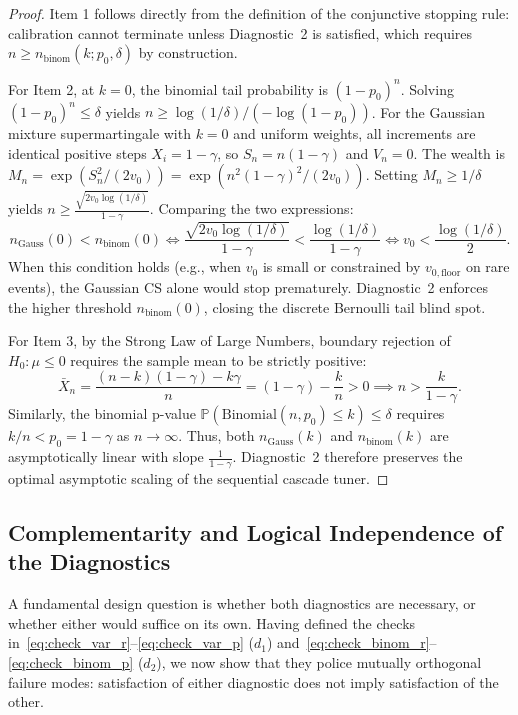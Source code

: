 \documentclass[11pt,a4paper]{article}
\begin{document}
\begin{proof}
Item 1 follows directly from the definition of the conjunctive stopping rule: calibration cannot terminate unless Diagnostic~2 is satisfied, which requires $n \ge n_{\text{binom}}(k; p_0, \delta)$ by construction.

For Item 2, at $k=0$, the binomial tail probability is $(1 - p_0)^n$. Solving $(1 - p_0)^n \le \delta$ yields $n \ge \log(1/\delta) / (-\log(1 - p_0))$.
For the Gaussian mixture supermartingale with $k=0$ and uniform weights, all increments are identical positive steps $X_i = 1 - \gamma$, so $S_n = n(1 - \gamma)$ and $V_n = 0$.
The wealth is $M_n = \exp(S_n^2 / (2 v_0)) = \exp(n^2 (1 - \gamma)^2 / (2 v_0))$.
Setting $M_n \ge 1/\delta$ yields $n \ge \frac{\sqrt{2 v_0 \log(1/\delta)}}{1 - \gamma}$.
Comparing the two expressions:
\begin{equation}
n_{\text{Gauss}}(0) < n_{\text{binom}}(0) \iff \frac{\sqrt{2 v_0 \log(1/\delta)}}{1 - \gamma} < \frac{\log(1/\delta)}{1 - \gamma} \iff v_0 < \frac{\log(1/\delta)}{2}.
\end{equation}
When this condition holds (e.g., when $v_0$ is small or constrained by $v_{0, \text{floor}}$ on rare events), the Gaussian CS alone would stop prematurely. Diagnostic~2 enforces the higher threshold $n_{\text{binom}}(0)$, closing the discrete Bernoulli tail blind spot.

For Item 3, by the Strong Law of Large Numbers, boundary rejection of $H_0: \mu \le 0$ requires the sample mean to be strictly positive:
\begin{equation}
\bar{X}_n = \frac{(n - k)(1 - \gamma) - k \gamma}{n} = (1 - \gamma) - \frac{k}{n} > 0 \implies n > \frac{k}{1 - \gamma}.
\end{equation}
Similarly, the binomial p-value $\mathbb{P}(\text{Binomial}(n, p_0) \le k) \le \delta$ requires $k/n < p_0 = 1 - \gamma$ as $n \to \infty$. Thus, both $n_{\text{Gauss}}(k)$ and $n_{\text{binom}}(k)$ are asymptotically linear with slope $\frac{1}{1 - \gamma}$. Diagnostic~2 therefore preserves the optimal asymptotic scaling of the sequential cascade tuner.
\end{proof}

\subsection{Complementarity and Logical Independence of the Diagnostics}\label{sec:diagnostic_independence}
A fundamental design question is whether both diagnostics are necessary, or whether either would suffice on its own. Having defined the checks in~\eqref{eq:check_var_r}--\eqref{eq:check_var_p} ($d_1$) and~\eqref{eq:check_binom_r}--\eqref{eq:check_binom_p} ($d_2$), we now show that they police mutually orthogonal failure modes: satisfaction of either diagnostic does not imply satisfaction of the other.
\end{document}
